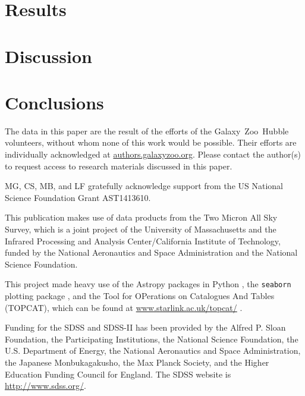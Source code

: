\documentclass[useAMS,usenatbib]{mn2e}
\begin{document}
\section{Results}
\label{sec:Results}


\section{Discussion}\label{sec:Discussion}


\section{Conclusions}
\label{sec:conclusions}



The data in this paper are the result of the efforts of the Galaxy~Zoo~Hubble volunteers, without whom none of this work would be possible. Their efforts are individually acknowledged at \url{authors.galaxyzoo.org}. Please contact the author(s) to request access to research materials discussed in this paper. 


MG, CS, MB, and LF gratefully acknowledge support from the US National
Science Foundation Grant AST1413610.

This publication makes use of data products from the Two Micron All Sky Survey, which is a joint project of the University of Massachusetts and the Infrared Processing and Analysis Center/California Institute of Technology, funded by the National Aeronautics and Space Administration and the National Science Foundation.

This project made heavy use of the Astropy packages in Python \citep{Robitaille2013}, the \texttt{seaborn} plotting package \citep{Waskom}, and the Tool for OPerations on Catalogues And Tables (TOPCAT), which can be found at \url{www.starlink.ac.uk/topcat/} \citep{topcat2011}. 

Funding for the SDSS and SDSS-II has been provided by the Alfred P. Sloan
Foundation, the Participating Institutions, the National Science Foundation,
the U.S. Department of Energy, the National Aeronautics and Space
Administration, the Japanese Monbukagakusho, the Max Planck Society, and the
Higher Education Funding Council for England. The SDSS website is
\url{http://www.sdss.org/}. 
\end{document}
